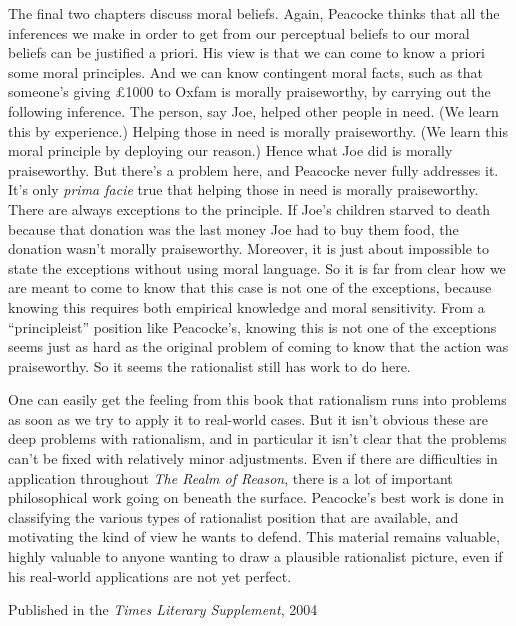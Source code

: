 \documentclass[
  11pt,
  letterpaper,
  DIV=11,
  numbers=noendperiod,
  twoside]{scrartcl}
\begin{document}
The final two chapters discuss moral beliefs. Again, Peacocke thinks
that all the inferences we make in order to get from our perceptual
beliefs to our moral beliefs can be justified a priori. His view is that
we can come to know a priori some moral principles. And we can know
contingent moral facts, such as that someone's giving £1000 to Oxfam is
morally praiseworthy, by carrying out the following inference. The
person, say Joe, helped other people in need. (We learn this by
experience.) Helping those in need is morally praiseworthy. (We learn
this moral principle by deploying our reason.) Hence what Joe did is
morally praiseworthy. But there's a problem here, and Peacocke never
fully addresses it. It's only \emph{prima facie} true that helping those
in need is morally praiseworthy. There are always exceptions to the
principle. If Joe's children starved to death because that donation was
the last money Joe had to buy them food, the donation wasn't morally
praiseworthy. Moreover, it is just about impossible to state the
exceptions without using moral language. So it is far from clear how we
are meant to come to know that this case is not one of the exceptions,
because knowing this requires both empirical knowledge and moral
sensitivity. From a ``principleist'' position like Peacocke's, knowing
this is not one of the exceptions seems just as hard as the original
problem of coming to know that the action was praiseworthy. So it seems
the rationalist still has work to do here.

One can easily get the feeling from this book that rationalism runs into
problems as soon as we try to apply it to real-world cases. But it isn't
obvious these are deep problems with rationalism, and in particular it
isn't clear that the problems can't be fixed with relatively minor
adjustments. Even if there are difficulties in application throughout
\emph{The Realm of Reason}, there is a lot of important philosophical
work going on beneath the surface. Peacocke's best work is done in
classifying the various types of rationalist position that are
available, and motivating the kind of view he wants to defend. This
material remains valuable, highly valuable to anyone wanting to draw a
plausible rationalist picture, even if his real-world applications are
not yet perfect.

\vspace{1cm}



Published in the \emph{Times Literary Supplement}, 2004 \\
\end{document}
